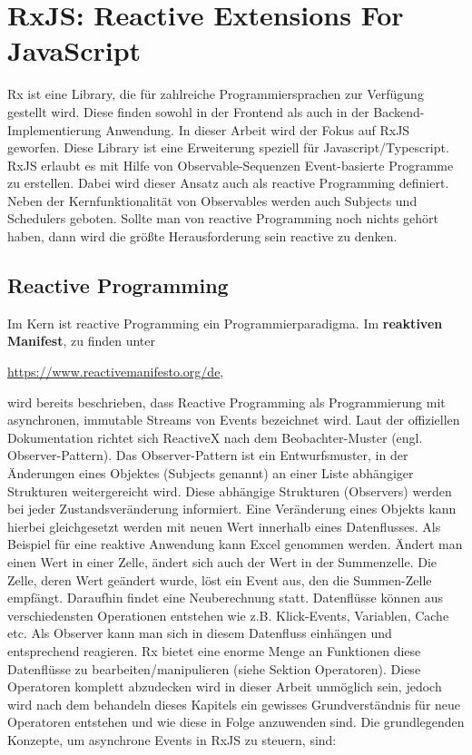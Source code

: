 \section{RxJS: Reactive Extensions For JavaScript}
Rx ist eine Library, die für zahlreiche Programmiersprachen zur Verfügung gestellt wird. Diese finden sowohl in der Frontend als auch in der Backend-Implementierung Anwendung. In dieser Arbeit wird der Fokus auf RxJS geworfen. Diese Library ist eine Erweiterung speziell für Javascript/Typescript. RxJS erlaubt es mit Hilfe von Observable-Sequenzen Event-basierte Programme zu erstellen. Dabei wird dieser Ansatz auch als reactive Programming definiert. Neben der Kernfunktionalität von Observables werden auch Subjects und Schedulers geboten. Sollte man von reactive Programming noch nichts gehört haben, dann wird die größte Herausforderung sein \glqq{}reactive\grqq{} zu denken.

\subsection{Reactive Programming}
Im Kern ist reactive Programming ein Programmierparadigma. Im \textbf{reaktiven Manifest}, zu finden unter

\begin{center}
\url{https://www.reactivemanifesto.org/de},
\end{center}

\noindent
wird bereits beschrieben, dass Reactive Programming als Programmierung mit asynchronen, immutable Streams von Events bezeichnet wird. Laut der offiziellen Dokumentation richtet sich ReactiveX nach dem Beobachter-Muster (engl. Observer-Pattern). Das Observer-Pattern ist ein Entwurfsmuster, in der Änderungen eines Objektes (Subjects genannt) an einer Liste abhängiger Strukturen weitergereicht wird. Diese abhängige Strukturen (Observers) werden bei jeder Zustandsveränderung informiert. Eine Veränderung eines Objekts kann hierbei gleichgesetzt werden mit neuen Wert innerhalb eines Datenflusses. Als Beispiel für eine reaktive Anwendung kann Excel genommen werden. Ändert man einen Wert in einer Zelle, ändert sich auch der Wert in der Summenzelle. Die Zelle, deren Wert geändert wurde, löst ein Event aus, den die Summen-Zelle empfängt. Daraufhin findet eine Neuberechnung statt.\cite{reactive-programming-beispiel} Datenflüsse können aus verschiedensten Operationen entstehen wie z.B. Klick-Events, Variablen, Cache etc. Als Observer kann man sich in diesem Datenfluss einhängen und entsprechend reagieren.\cite{rx-intro} Rx bietet eine enorme Menge an Funktionen diese Datenflüsse zu bearbeiten/manipulieren (siehe Sektion Operatoren). Diese Operatoren komplett abzudecken wird in dieser Arbeit unmöglich sein, jedoch wird nach dem behandeln dieses Kapitels ein gewisses Grundverständnis für neue Operatoren entstehen und wie diese in Folge anzuwenden sind. Die grundlegenden Konzepte, um asynchrone Events in RxJS zu steuern, sind:

